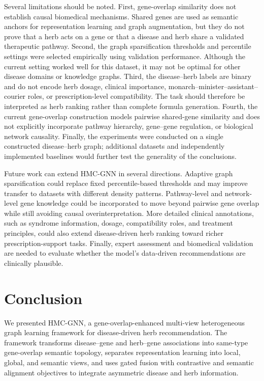 \documentclass[journal,twoside,web]{ieeecolor}
\begin{document}
Several limitations should be noted. First, gene-overlap similarity does not establish causal biomedical mechanisms. Shared genes are used as semantic anchors for representation learning and graph augmentation, but they do not prove that a herb acts on a gene or that a disease and herb share a validated therapeutic pathway. Second, the graph sparsification thresholds and percentile settings were selected empirically using validation performance. Although the current setting worked well for this dataset, it may not be optimal for other disease domains or knowledge graphs. Third, the disease--herb labels are binary and do not encode herb dosage, clinical importance, monarch--minister--assistant--courier roles, or prescription-level compatibility. The task should therefore be interpreted as herb ranking rather than complete formula generation. Fourth, the current gene-overlap construction models pairwise shared-gene similarity and does not explicitly incorporate pathway hierarchy, gene--gene regulation, or biological network causality. Finally, the experiments were conducted on a single constructed disease--herb graph; additional datasets and independently implemented baselines would further test the generality of the conclusions.

Future work can extend HMC-GNN in several directions. Adaptive graph sparsification could replace fixed percentile-based thresholds and may improve transfer to datasets with different density patterns. Pathway-level and network-level gene knowledge could be incorporated to move beyond pairwise gene overlap while still avoiding causal overinterpretation. More detailed clinical annotations, such as syndrome information, dosage, compatibility roles, and treatment principles, could also extend disease-driven herb ranking toward richer prescription-support tasks. Finally, expert assessment and biomedical validation are needed to evaluate whether the model's data-driven recommendations are clinically plausible.

\section{Conclusion}
\label{sec:conclusion}

We presented HMC-GNN, a gene-overlap-enhanced multi-view heterogeneous graph learning framework for disease-driven herb recommendation. The framework transforms disease--gene and herb--gene associations into same-type gene-overlap semantic topology, separates representation learning into local, global, and semantic views, and uses gated fusion with contrastive and semantic alignment objectives to integrate asymmetric disease and herb information.
\end{document}
